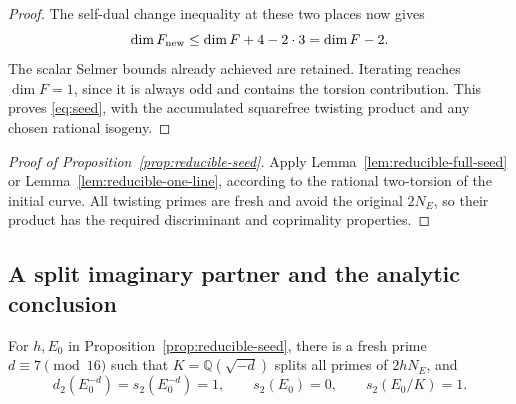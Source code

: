 \begin{proof}
The self-dual change inequality at these two places now gives
\[
 \dim F_{\rm new}\le\dim F+4-2\cdot3=\dim F-2.
\]
The scalar Selmer bounds already achieved are retained.  Iterating reaches
\(\dim F=1\), since it is always odd and contains the torsion contribution.
This proves \eqref{eq:seed}, with the accumulated squarefree twisting
product and any chosen rational isogeny.
\end{proof}

\begin{proof}[Proof of Proposition~\ref{prop:reducible-seed}]
Apply Lemma~\ref{lem:reducible-full-seed} or
Lemma~\ref{lem:reducible-one-line}, according to the rational two-torsion
of the initial curve.  All twisting primes are fresh and avoid the
original \(2N_E\), so their product has the required discriminant and
coprimality properties.
\end{proof}

\subsection{A split imaginary partner and the analytic conclusion}

\begin{proposition}\label{prop:reducible-partner}
For \(h,E_0\) in Proposition~\ref{prop:reducible-seed}, there is a fresh
prime \(d\equiv7\pmod{16}\) such that
\(K=\mathbb Q(\sqrt{-d})\) splits all primes of \(2hN_E\), and
\[
 d_2(E_0^{-d})=s_2(E_0^{-d})=1,\qquad
 s_2(E_0)=0,\qquad s_2(E_0/K)=1.
\]
\end{proposition}

